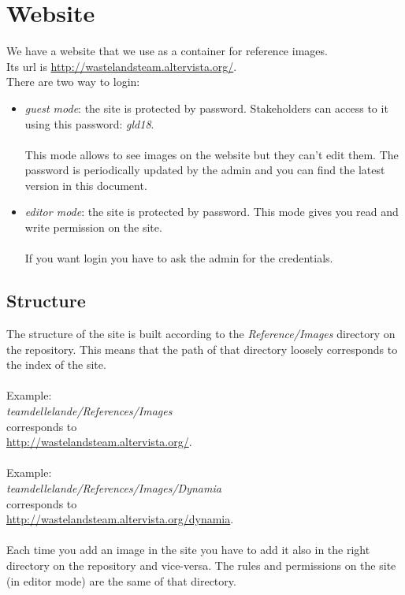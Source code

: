 \section{Website}
We have a website that we use as a container for reference images. \\Its url is \href{http://wastelandsteam.altervista.org/}{http://wastelandsteam.altervista.org/}.\\

There are two way to login: 
\begin{itemize}
\item \textit{guest mode}: the site is protected by password. Stakeholders can access to it using this password: \textit{gld18}.\\\\
  This mode allows to see images on the website but they can't edit them. The password is periodically updated by the admin and you can find the latest version in this document.
\item \textit{editor mode}: the site is protected by password. This mode gives you read and write permission on the site.\\\\
  If you want login you have to ask the admin for the credentials.
\end{itemize}

\subsection{Structure}
The structure of the site is built according to the \textit{Reference/Images} directory on the repository.
This means that the path of that directory loosely corresponds to the index of the site.\\\\
Example: \\
\textit{teamdellelande/References/Images} \\corresponds to\\ \href{http://wastelandsteam.altervista.org/}{http://wastelandsteam.altervista.org/}.\\\\
Example: \\
\textit{teamdellelande/References/Images/Dynamia} \\corresponds to\\ \href{http://wastelandsteam.altervista.org/dynamia}{http://wastelandsteam.altervista.org/dynamia}.\\\\
Each time you add an image in the site you have to add it also in the right directory on the repository and vice-versa.
The rules and permissions on the site (in editor mode) are the same of that directory.
